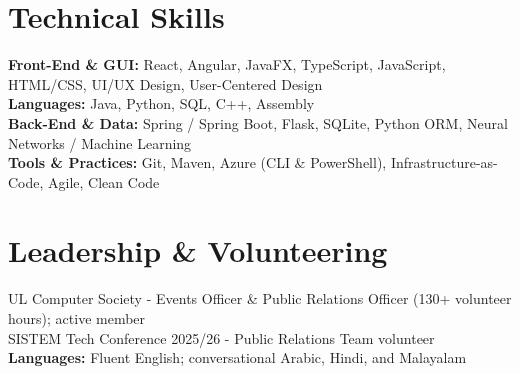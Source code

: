 \documentclass[10pt,a4paper]{article}
\newcommand{\cvSkillRow}[2]{%
  \textbf{#1:} #2 \\[2pt]
}
\begin{document}
\vspace{2pt}

\section{Technical Skills}\label{sec:technical-skills}
\small
\cvSkillRow{Front-End \& GUI}{React, Angular, JavaFX, TypeScript, JavaScript, HTML/CSS, UI/UX Design, User-Centered Design}
\cvSkillRow{Languages}{Java, Python, SQL, C++, Assembly}
\cvSkillRow{Back-End \& Data}{Spring / Spring Boot, Flask, SQLite, Python ORM, Neural Networks / Machine Learning}
\cvSkillRow{Tools \& Practices}{Git, Maven, Azure (CLI \& PowerShell), Infrastructure-as-Code, Agile, Clean Code}

\section{Leadership \& Volunteering}\label{sec:leadership-&-volunteering}
\small
UL Computer Society - Events Officer \& Public Relations Officer (130+ volunteer hours); active member \\
SISTEM Tech Conference 2025/26 - Public Relations Team volunteer \\[3pt]
\textbf{Languages:} Fluent English; conversational Arabic, Hindi, and Malayalam
\end{document}
